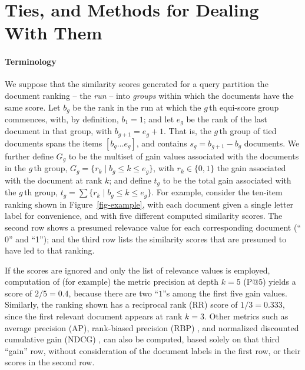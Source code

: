 \documentclass[runningheads,a4paper]{llncs}
\newcommand{\myparagraph}[1]{\vspace*{-0.7ex}\paragraph*{\normalsize\bf{#1}}}
\begin{document}
 \section{Ties, and Methods for Dealing With Them}
\label{sec-ties}

\myparagraph{Terminology}

We suppose that the similarity scores generated for a query partition
the document ranking -- the {\emph{run}} -- into {\emph{groups}}
within which the documents have the same score.
Let $b_g$ be the rank in the run at which the $g$\,th equi-score
group commences, with, by definition, $b_1=1$; and let $e_g$ be the
rank of the last document in that group, with $b_{g+1}=e_g+1$.
That is, the $g$\,th group of tied documents spans the items
$[b_g\ldots e_g]$, and contains $s_g=b_{g+1}-b_g$ documents.
We further define $G_g$ to be the multiset of gain values associated
with the documents in the $g$\,th group,
	$G_g =\{r_k\mid b_g \le k \le e_g\}$, 
with $r_k\in\{0,1\}$ the gain associated with the document at rank $k$;
and define $t_g$
to be the total gain associated with the $g$\,th group,
	$t_g = \sum \{r_k\mid b_g \le k \le e_g\}$.
For example, consider the ten-item ranking shown in
Figure~\ref{fig-example}, with each document given a single letter
label for convenience, and with five different computed similarity
scores.
The second row shows a presumed relevance value for each
corresponding document (``$0$'' and ``1''); and the third row lists
the similarity scores that are presumed to have led to that ranking.

If the scores are ignored and only the list of relevance values is
employed, computation of (for example) the metric precision at depth
$k=5$ (P@$5$) yields a score of $2/5=0.4$, because there are two
``$1$''s among the first five gain values.
Similarly, the ranking shown has a reciprocal rank (RR) score of
$1/3=0.333$, since the first relevant document appears at rank $k=3$.
Other metrics such as average precision (AP), rank-biased precision
(RBP) {\citep{mz08acmtois}}, and normalized discounted cumulative
gain (NDCG) {\citep{jk02acmtois}}, can also be computed, based solely
on that third ``gain'' row, without consideration of the document
labels in the first row, or their scores in the second row.
\end{document}
